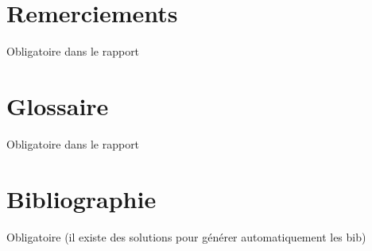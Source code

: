 \documentclass[12pt,a4paper,twoside]{article}
\begin{document}
    \newpage
    \section{Remerciements}                         %
    Obligatoire dans le rapport

    \newpage
    \section{Glossaire}                             %
    Obligatoire dans le rapport


    \newpage
    \section{Bibliographie}                         %
    Obligatoire (il existe des solutions pour générer automatiquement les bib)
\end{document}
